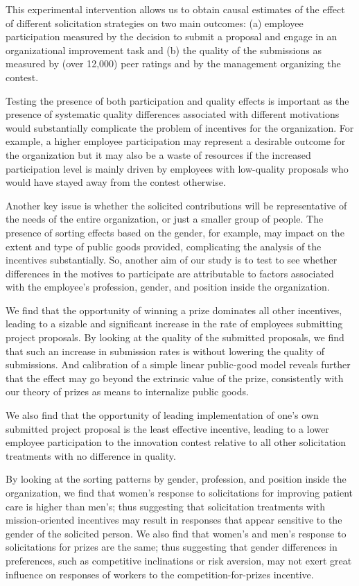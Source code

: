 \documentclass[11pt, titlepage]{article}
\begin{document}
This experimental intervention allows us to obtain causal estimates of
the effect of different solicitation strategies on two main outcomes:
(a) employee participation measured by the decision to submit a proposal
and engage in an organizational improvement task and (b) the quality of
the submissions as measured by (over 12,000) peer ratings and by the
management organizing the contest.

Testing the presence of both participation and quality effects is
important as the presence of systematic quality differences associated
with different motivations would substantially complicate the problem of
incentives for the organization. For example, a higher employee
participation may represent a desirable outcome for the organization but
it may also be a waste of resources if the increased participation level
is mainly driven by employees with low-quality proposals who would have
stayed away from the contest otherwise.

Another key issue is whether the solicited contributions will be
representative of the needs of the entire organization, or just a
smaller group of people. The presence of sorting effects based on the
gender, for example, may impact on the extent and type of public goods
provided, complicating the analysis of the incentives substantially. So,
another aim of our study is to test to see whether differences in the
motives to participate are attributable to factors associated with the
employee's profession, gender, and position inside the organization.

We find that the opportunity of winning a prize dominates all other
incentives, leading to a sizable and significant increase in the rate of
employees submitting project proposals. By looking at the quality of the
submitted proposals, we find that such an increase in submission rates
is without lowering the quality of submissions. And calibration of a
simple linear public-good model reveals further that the effect may go
beyond the extrinsic value of the prize, consistently with our theory of
prizes as means to internalize public goods.

We also find that the opportunity of leading implementation of one's own
submitted project proposal is the least effective incentive, leading to
a lower employee participation to the innovation contest relative to all
other solicitation treatments with no difference in quality.

By looking at the sorting patterns by gender, profession, and position
inside the organization, we find that women's response to solicitations
for improving patient care is higher than men's; thus suggesting that
solicitation treatments with mission-oriented incentives may result in
responses that appear sensitive to the gender of the solicited person.
We also find that women's and men's response to solicitations for prizes
are the same; thus suggesting that gender differences in preferences,
such as competitive inclinations or risk aversion, may not exert great
influence on responses of workers to the competition-for-prizes
incentive.
\end{document}

